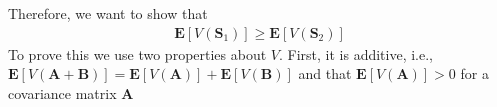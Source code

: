 Therefore, we want to show that 
\begin{eqnarray}
    \mathbf{E}[V(\mathbf{S}_1)] \geq \mathbf{E}[V(\mathbf{S}_2)]
\end{eqnarray}
To prove this we use two properties about $V$. First, it is additive, i.e., $\mathbf{E}[V(\mathbf{A} + \mathbf{B})] = \mathbf{E}[V(\mathbf{A})] + \mathbf{E}[V(\mathbf{B})]$ and that $\mathbf{E}[V(\mathbf{A})] > 0$  for a covariance matrix $\mathbf{A}$ 

